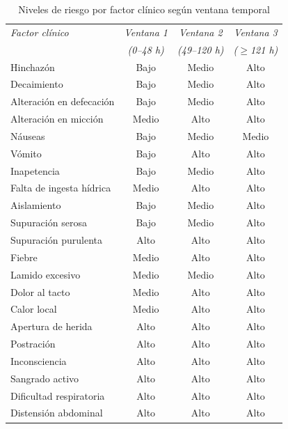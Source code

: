 \documentclass[stu, spanish]{apa7}
\begin{document}
\begin{table}[htbp]
\caption{Niveles de riesgo por factor cl\'{i}nico seg\'{u}n ventana temporal}
\label{tab:riesgo_ventana}
\footnotesize
\begin{tabular}{@{}lccc@{}}
\toprule
\textit{Factor cl\'{i}nico} & \textit{Ventana 1} & \textit{Ventana 2} & \textit{Ventana 3} \\
                          & \textit{(0--48 h)} & \textit{(49--120 h)} & \textit{($\geq$121 h)} \\
\midrule
Hinchaz\'{o}n              & Bajo  & Medio & Alto \\
Decaimiento                & Bajo  & Medio & Alto \\
Alteraci\'{o}n en defecaci\'{o}n & Bajo  & Medio & Alto \\
Alteraci\'{o}n en micci\'{o}n    & Medio & Alto  & Alto \\
N\'{a}useas                & Bajo  & Medio & Medio \\
V\'{o}mito                 & Bajo  & Alto  & Alto \\
Inapetencia                & Bajo  & Medio & Alto \\
Falta de ingesta h\'{i}drica & Medio & Alto  & Alto \\
Aislamiento                & Bajo  & Medio & Alto \\
Supuraci\'{o}n serosa      & Bajo  & Medio & Alto \\
Supuraci\'{o}n purulenta   & Alto  & Alto  & Alto \\
Fiebre                     & Medio & Alto  & Alto \\
Lamido excesivo            & Medio & Medio & Alto \\
Dolor al tacto             & Medio & Alto  & Alto \\
Calor local                & Medio & Alto  & Alto \\
Apertura de herida         & Alto  & Alto  & Alto \\
Postraci\'{o}n             & Alto  & Alto  & Alto \\
Inconsciencia              & Alto  & Alto  & Alto \\
Sangrado activo            & Alto  & Alto  & Alto \\
Dificultad respiratoria    & Alto  & Alto  & Alto \\
Distensi\'{o}n abdominal   & Alto  & Alto  & Alto \\
\bottomrule
\end{tabular}
\end{table}
\end{document}
